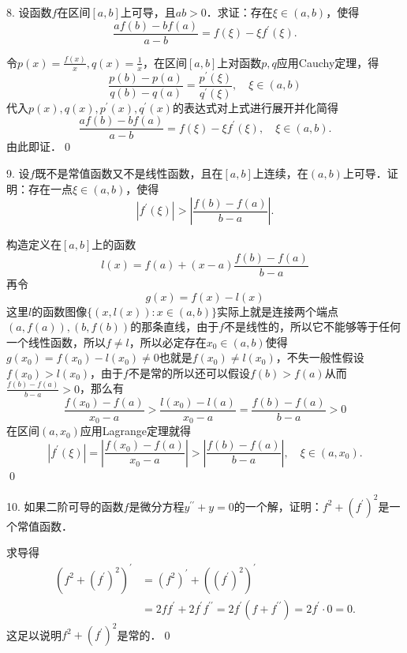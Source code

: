 8. 设函数$f$在区间$[a,b]$上可导，且$ab>0$．求证：存在$\xi \in (a,b)$，使得
\begin{equation*}
    \frac{af(b)-bf(a)}{a-b} = f(\xi) - \xi f^{\prime}(\xi).
\end{equation*}

\prove 令$p(x) = \displaystyle\frac{f(x)}{x}, q(x) = \frac{1}{x}$，在区间$[a,b]$上对函数$p,q$应用Cauchy定理，得
\begin{equation}
    \frac{p(b)-p(a)}{q(b)-q(a)} = \frac{p^{\prime}(\xi)}{q^{\prime}(\xi)}, \quad \xi \in (a,b)
\end{equation}
代入$p(x),q(x),p^\prime (x), q^\prime (x)$的表达式对上式进行展开并化简得
\begin{equation}
    \frac{af(b)-bf(a)}{a-b} = f(\xi) - \xi f^{\prime}(\xi), \quad \xi \in (a,b).
\end{equation}
由此即证．\qed\bigskip

9. 设$f$既不是常值函数又不是线性函数，且在$[a,b]$上连续，在$(a,b)$上可导．证明：存在一点$\xi \in (a,b)$，使得
\begin{equation*}
    \left| f^{\prime}\left(\xi\right) \right| > \left| \frac{f(b)-f(a)}{b-a} \right|.
\end{equation*}

\prove 构造定义在$[a,b]$上的函数
\begin{equation}
    l(x) = f(a) + \left(x-a\right) \frac{f(b)-f(a)}{b-a}
\end{equation}
再令
\begin{equation}
    g(x) = f(x) - l(x)
\end{equation}
这里$l$的函数图像$\{ (x, l(x)) : x \in (a,b) \}$实际上就是连接两个端点$(a,f(a)), (b,f(b))$的那条直线，由于$f$不是线性的，所以它不能够等于任何一个线性函数，所以$f \neq l$，所以必定存在$x_0 \in (a,b)$使得$g(x_0)=f(x_0)-l(x_0) \neq 0$也就是$f(x_0) \neq l(x_0)$，不失一般性假设$f(x_0) > l(x_0)$，由于$f$不是常的所以还可以假设$f(b)>f(a)$从而$\displaystyle\frac{f(b)-f(a)}{b-a}>0$，那么有
\begin{equation}
    \frac{f(x_0)-f(a)}{x_0-a} > \frac{l(x_0)-l(a)}{x_0-a} = \frac{f(b)-f(a)}{b-a} > 0
\end{equation}
在区间$(a,x_0)$应用Lagrange定理就得
\begin{equation}
    \left| f^{\prime}(\xi) \right| = \left| \frac{f(x_0)-f(a)}{x_0-a} \right| > \left| \frac{f(b)-f(a)}{b-a} \right|, \quad \xi \in (a, x_0).
\end{equation}
\qed\bigskip

10. 如果二阶可导的函数$f$是微分方程$y^{\prime\prime}+y=0$的一个解，证明：$f^2+(f^\prime)^2$是一个常值函数．

\prove 求导得
\begin{align}
    \left(f^2 + \left(f^\prime\right)^2\right)^\prime &= \left(f^2\right)^\prime + \left(\left(f^\prime\right)^2\right)^\prime \\
    &= 2 f f^\prime + 2 f^\prime f^{\prime\prime} = 2f^\prime \left(f+f^{\prime\prime}\right) = 2f^\prime \cdot 0 = 0.
\end{align}
这足以说明$f^2 + \left(f^\prime\right)^2$是常的．\qed\bigskip